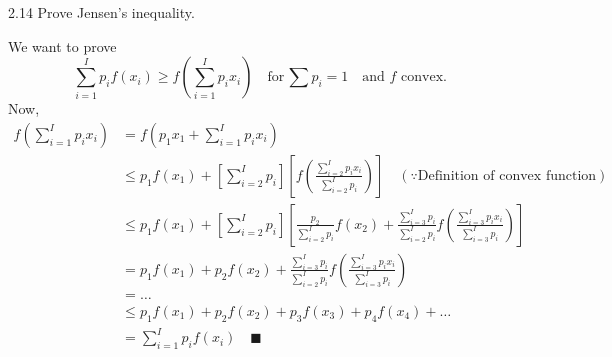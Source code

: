 \documentclass[12pt, a4paper]{article}
\begin{document}
\begin{prob}{2.14}
    Prove Jensen’s inequality.
\end{prob}
\begin{sol}
    We want to prove 
    $$
    \sum_{i=1}^{I} p_i f(x_i) \geq f(\sum_{i=1}^{I} p_i x_i) \quad \text{for} \, \sum p_i = 1 \quad \text{and $f$ convex.}
    $$
    Now,
    \begin{align*}
        f(\sum_{i=1}^{I} p_i x_i) &= f(p_1 x_1 + \sum_{i=1}^{I} p_i x_i) \\
        &\leq p_1 f(x_1) + [\sum_{i=2}^{I} p_i] [f(\frac{\sum_{i=2}^{I} p_i x_i}{\sum_{i=2}^{I} p_i})] \quad (\because \text{Definition of convex function}) \\
        &\leq p_1 f(x_1) + [\sum_{i=2}^{I} p_i] [\frac{p_2}{\sum_{i=2}^{I} p_i} f(x_2) + \frac{\sum_{i=3}^{I} p_i}{\sum_{i=2}^{I} p_i} f(\frac{\sum_{i=3}^{I} p_i x_i}{\sum_{i=3}^{I} p_i})] \\
        &= p_1 f(x_1) + p_2 f(x_2) + \frac{\sum_{i=3}^{I} p_i}{\sum_{i=2}^{I} p_i} f(\frac{\sum_{i=3}^{I} p_i x_i}{\sum_{i=3}^{I} p_i}) \\
        &= \dots \\
        &\leq p_1 f(x_1) + p_2 f(x_2) + p_3 f(x_3) + p_4 f(x_4) + \dots \\
        &= \sum_{i=1}^{I} p_i f(x_i) \quad \blacksquare
    \end{align*}
\end{sol}
\bigskip
\end{document}
